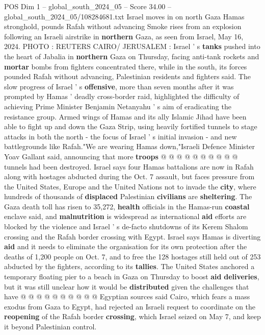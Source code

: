 \begin{textsample}{POS Dim 1 – global\_south\_2024\_05 – Score 34.00 – global\_south\_2024\_05/108284681.txt}  \label{ex:f1_pos_079}
Israel moves in on north Gaza Hamas stronghold, pounds Rafah without advancing Smoke rises from an explosion following an Israeli airstrike in \textbf{northern} Gaza, as seen from Israel, May 16, 2024.
PHOTO : REUTERS CAIRO/ JERUSALEM : Israel ' s \textbf{tanks} pushed into the heart of Jabalia in \textbf{northern} Gaza on Thursday, facing anti-tank rockets and \textbf{mortar} bombs from fighters concentrated there, while in the south, its forces pounded Rafah without advancing, Palestinian residents and fighters said.
The slow progress of Israel ' s \textbf{offensive}, more than seven months after it was prompted by Hamas ' deadly cross-border raid, highlighted the difficulty of achieving Prime Minister Benjamin Netanyahu ' s aim of eradicating the resistance group.
Armed wings of Hamas and its ally Islamic Jihad have been able to fight up and down the Gaza Strip, using heavily fortified tunnels to stage attacks in both the north - the focus of Israel ' s initial invasion - and new battlegrounds like Rafah."We are wearing Hamas down,"Israeli Defence Minister Yoav Gallant said, announcing that more \textbf{troops} @ @ @ @ @ @ @ @ @ @ tunnels had been destroyed.
Israel says four Hamas battalions are now in Rafah along with hostages abducted during the Oct. 7 assault, but faces pressure from the United States, Europe and the United Nations not to invade the \textbf{city}, where hundreds of thousands of \textbf{displaced} Palestinian \textbf{civilians} are \textbf{sheltering}.
The Gaza death toll has risen to 35,272, \textbf{health} officials in the Hamas-run \textbf{coastal} enclave said, and \textbf{malnutrition} is widespread as international \textbf{aid} efforts are blocked by the violence and Israel ' s de-facto shutdowns of its Kerem Shalom crossing and the Rafah border crossing with Egypt.
Israel says Hamas is diverting \textbf{aid} and it needs to eliminate the organisation for its own protection after the deaths of 1,200 people on Oct. 7, and to free the 128 hostages still held out of 253 abducted by the fighters, according to its \textbf{tallies}.
The United States anchored a temporary floating pier to a beach in Gaza on Thursday to boost \textbf{aid} \textbf{deliveries}, but it was still unclear how it would be \textbf{distributed} given the challenges that have @ @ @ @ @ @ @ @ @ @ Egyptian sources said Cairo, which fears a mass exodus from Gaza to Egypt, had rejected an Israeli request to coordinate on the \textbf{reopening} of the Rafah border \textbf{crossing}, which Israel seized on May 7, and keep it beyond Palestinian control.

\end{textsample}
